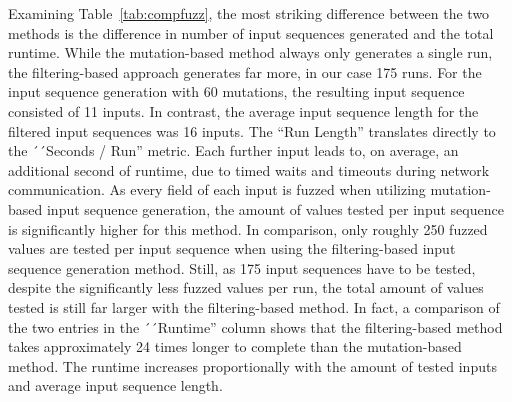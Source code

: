 Examining Table~\ref{tab:compfuzz}, the most striking difference between the two methods is the difference in number of input sequences generated and the total runtime. While the mutation-based method always only generates a single run, the filtering-based approach generates far more, in our case 175 runs. For the input sequence generation with 60 mutations, the resulting input sequence consisted of 11 inputs. In contrast, the average input sequence length for the filtered input sequences was 16 inputs. The ``Run Length'' translates directly to the  ´´Seconds / Run'' metric. Each further input leads to, on average, an additional second of runtime, due to timed waits and timeouts during network communication. As every field of each input is fuzzed when utilizing mutation-based input sequence generation, the amount of values tested per input sequence is significantly higher for this method. In comparison, only roughly 250 fuzzed values are tested per input sequence when using the filtering-based input sequence generation method. Still, as 175 input sequences have to be tested, despite the significantly less fuzzed values per run, the total amount of values tested is still far larger with the filtering-based method. In fact, a comparison of the two entries in the ´´Runtime'' column shows that the filtering-based method takes approximately 24 times longer to complete than the mutation-based method. The runtime increases proportionally with the amount of tested inputs and average input sequence length.